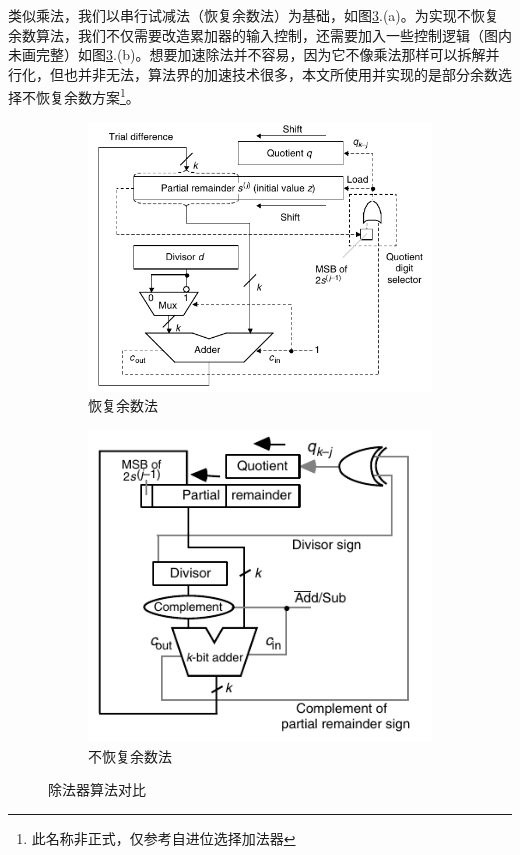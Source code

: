 \documentclass[UTF8,12pt,punct=kaiming,fontset=none]{article}
\begin{document}
    类似乘法，我们以串行试减法（恢复余数法）为基础，如图\ref{fig4}.(a)。为实现不恢复余数算法，我们不仅需要改造累加器的输入控制，还需要加入一些控制逻辑（图内未画完整）如图\ref{fig4}.(b)。想要加速除法并不容易，因为它不像乘法那样可以拆解并行化，但也并非无法，算法界的加速技术很多，本文所使用并实现的是部分余数选择不恢复余数方案\footnote{此名称非正式，仅参考自进位选择加法器}。
    \begin{figure}[H]
        \centering
        \begin{subfigure}{3in}
            \centering
            \includegraphics[width=\linewidth]{div1.pdf}
            \caption{恢复余数法}
            \label{fig:a}
        \end{subfigure}
        \begin{subfigure}{2.5in}
            \centering
            \includegraphics[width=\linewidth]{div2.pdf}
            \caption{不恢复余数法}
            \label{ubfig:b}
        \end{subfigure}
        \caption{除法器算法对比\cite{parhami2010computer}}
        \label{fig4}
    \end{figure}
\end{document}
